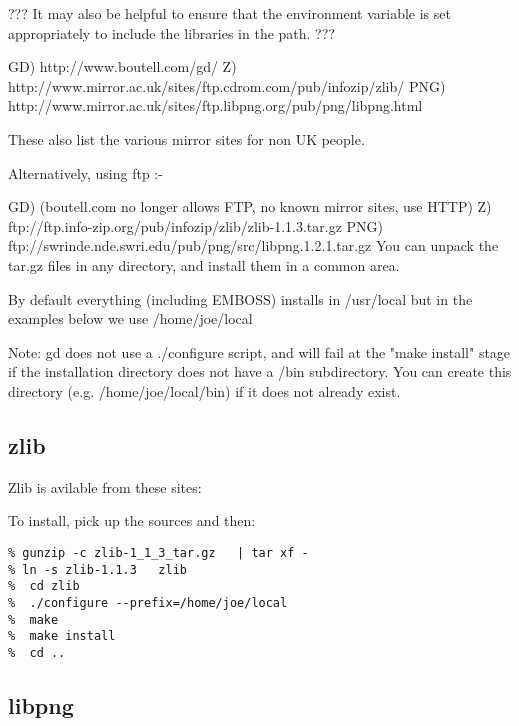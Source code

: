 \documentclass{report}
\begin{document}
??? It may also be helpful to ensure that the 
environment variable is set appropriately to include the libraries in
the path. ???

   GD)  http://www.boutell.com/gd/
   Z)   http://www.mirror.ac.uk/sites/ftp.cdrom.com/pub/infozip/zlib/
   PNG) http://www.mirror.ac.uk/sites/ftp.libpng.org/pub/png/libpng.html

   These also list the various mirror sites for non UK people.

   Alternatively, using ftp :-

   GD)  (boutell.com no longer allows FTP, no known mirror sites, use HTTP)
   Z)   ftp://ftp.info-zip.org/pub/infozip/zlib/zlib-1.1.3.tar.gz
   PNG) ftp://swrinde.nde.swri.edu/pub/png/src/libpng.1.2.1.tar.gz
   You can unpack the tar.gz files in any directory, and install them in
   a common area.

   By default everything (including EMBOSS) installs
   in /usr/local but in the examples below we use /home/joe/local

   Note: gd does not use a ./configure script, and will fail at the
   "make install" stage if the installation directory does not have a
   /bin subdirectory. You can create this directory
   (e.g. /home/joe/local/bin) if it does not already exist.

\subsection{zlib}

Zlib is avilable from these sites:


To install, pick up the sources and then:

\begin{verbatim}
% gunzip -c zlib-1_1_3_tar.gz   | tar xf -
% ln -s zlib-1.1.3   zlib
%  cd zlib
%  ./configure --prefix=/home/joe/local
%  make
%  make install
%  cd ..
\end{verbatim}

\subsection{libpng}
\end{document}

